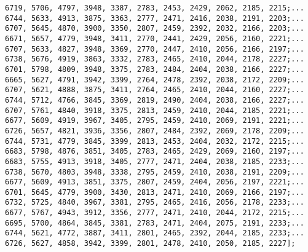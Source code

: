\begin{verbatim}
6719, 5706, 4797, 3948, 3387, 2783, 2453, 2429, 2062, 2185, 2215;...
6744, 5633, 4913, 3875, 3363, 2777, 2471, 2416, 2038, 2191, 2203;...
6707, 5645, 4870, 3900, 3350, 2807, 2459, 2392, 2032, 2166, 2203;...
6671, 5657, 4779, 3948, 3411, 2770, 2441, 2429, 2056, 2160, 2221;...
6707, 5633, 4827, 3948, 3369, 2770, 2447, 2410, 2056, 2166, 2197;...
6738, 5676, 4919, 3863, 3332, 2783, 2465, 2410, 2044, 2178, 2227;...
6701, 5798, 4809, 3948, 3375, 2783, 2484, 2404, 2038, 2166, 2227;...
6665, 5627, 4791, 3942, 3399, 2764, 2478, 2392, 2038, 2172, 2209;...
6707, 5621, 4888, 3875, 3411, 2764, 2465, 2410, 2044, 2160, 2227;...
6744, 5712, 4766, 3845, 3369, 2819, 2490, 2404, 2038, 2166, 2227;...
6707, 5761, 4840, 3918, 3375, 2813, 2459, 2410, 2044, 2185, 2221;...
6677, 5609, 4919, 3967, 3405, 2795, 2459, 2410, 2069, 2191, 2221;...
6726, 5657, 4821, 3936, 3356, 2807, 2484, 2392, 2069, 2178, 2209;...
6744, 5731, 4779, 3845, 3399, 2813, 2453, 2404, 2032, 2172, 2215;...
6683, 5798, 4876, 3851, 3405, 2783, 2465, 2429, 2069, 2160, 2197;...
6683, 5755, 4913, 3918, 3405, 2777, 2471, 2404, 2038, 2185, 2233;...
6738, 5670, 4803, 3948, 3338, 2795, 2459, 2410, 2038, 2191, 2209;...
6677, 5609, 4913, 3851, 3375, 2807, 2459, 2404, 2056, 2197, 2221;...
6701, 5645, 4779, 3900, 3430, 2813, 2471, 2410, 2069, 2166, 2197;...
6732, 5725, 4840, 3967, 3381, 2795, 2465, 2416, 2056, 2178, 2233;...
6677, 5767, 4943, 3912, 3356, 2777, 2471, 2410, 2044, 2172, 2215;...
6695, 5700, 4864, 3845, 3381, 2783, 2471, 2404, 2075, 2191, 2233;...
6744, 5621, 4772, 3887, 3411, 2801, 2465, 2392, 2044, 2185, 2233;...
6726, 5627, 4858, 3942, 3399, 2801, 2478, 2410, 2050, 2185, 2227];
\end{verbatim}



